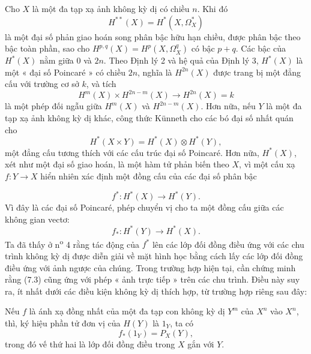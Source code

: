 Cho $X$ là một đa tạp xạ ảnh không kỳ dị có chiều $n$. Khi đó
\[
  H^{**}(X)=H^{*}(X,\Omega_X^{*})
\]
là một đại số phản giao hoán song phân bậc hữu hạn chiều, được phân bậc
theo bậc toàn phần, sao cho $H^{p,q}(X)=H^{p}(X,\Omega_X^{q})$ có bậc
$p+q$. Các bậc của $H^{*}(X)$ nằm giữa $0$ và $2n$. Theo
Định lý 2 và hệ quả của Định lý 3, $H^{*}(X)$ là một « đại số
Poincaré » có chiều $2n$, nghĩa là $H^{2n}(X)$ được trang bị một đẳng cấu với
trường cơ sở $k$, và tích
\[
  H^{m}(X)\times H^{2n-m}(X)\longrightarrow H^{2n}(X)=k
\]
là một phép đối ngẫu giữa $H^{m}(X)$ và $H^{2n-m}(X)$. Hơn nữa, nếu $Y$ là một
đa tạp xạ ảnh không kỳ dị khác, công thức Künneth cho các
bó đại số nhất quán cho
\begin{equation}\tag{7.1}
  H^{*}(X\times Y)=H^{*}(X)\otimes H^{*}(Y),
\end{equation}
một đẳng cấu tương thích với các cấu trúc đại số Poincaré. Hơn nữa,
$H^{*}(X)$, xét như một đại số giao hoán, là một hàm tử phản biến theo
$X$, vì một cấu xạ $f:Y\longrightarrow X$ hiển nhiên xác định một
đồng cấu của các đại số phân bậc

\begin{equation}\tag{7.2}
  f^{*}:H^{*}(X)\longrightarrow H^{*}(Y).
\end{equation}
Vì đây là các đại số Poincaré, phép chuyển vị cho ta một đồng cấu giữa các
không gian vectơ:
\begin{equation}\tag{7.3}
  f_{*}:H^{*}(Y)\longrightarrow H^{*}(X).
\end{equation}
Ta đã thấy ở n\textsuperscript{o} 4 rằng tác động của $f^{*}$ lên các lớp đối đồng điều
ứng với các chu trình không kỳ dị được diễn giải về mặt hình học bằng cách
lấy các lớp đối đồng điều ứng với ảnh ngược của chúng. Trong trường hợp hiện
tại, cần chứng minh rằng (7.3) cũng ứng với phép « ảnh trực tiếp » trên các
chu trình. Điều này suy ra, ít nhất dưới các điều kiện không kỳ dị thích hợp,
từ trường hợp riêng sau đây:

 Nếu $f$ là ánh xạ đồng nhất của một đa tạp con không
kỳ dị $Y^{m}$ của $X^{n}$ vào $X^{n}$, thì, ký hiệu
phần tử đơn vị của $H(Y)$ là $1_Y$, ta có
\begin{equation}\tag{7.4}
  f_{*}(1_Y)=P_X(Y),
\end{equation}
trong đó vế thứ hai là lớp đối đồng điều trong $X$ gắn với $Y$.

